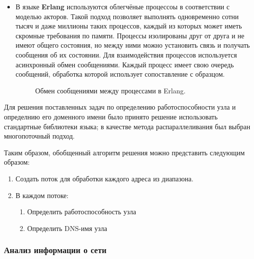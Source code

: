 \documentclass[a4paper]{article}
\begin{document}
\begin{itemize}
				\item В языке \textbf{Erlang} используются облегчёные процессоы в соответствии с моделью акторов. Такой подход позволяет выполнять одновременно сотни тысяч и даже миллионы таких процессов, каждый из которых может иметь скромные требования по памяти. Процессы изолированы друг от друга и не имеют общего состояния, но между ними можно установить связь и получать сообщения об их состоянии. Для взаимодействия процессов используется асинхронный обмен сообщениями. Каждый процесс имеет свою очередь сообщений, обработка которой использует сопоставление с образцом.
				\begin{figure}[H]
					\caption{Обмен сообщениями между процессами в Erlang.}
				\label{fig:ErlangThread}
			\end{figure}
		\end{itemize}
		
		Для решения поставленных задач по определению работоспособности узла и определнию его доменного имени было принято решение использовать стандартные библиотеки языка; в качестве метода распараллеливания был выбран многопоточный подход.
		
		Таким образом, обобщенный алгоритм решения можно представить следующим образом:
		
		\begin{enumerate}
			\item 
			Создать поток для обработки каждого адреса из диапазона.
			\item 
			В каждом потоке:
			\begin{enumerate}
				\item Определить работоспособность узла
				\item Определить DNS-имя узла
			\end{enumerate}
		\end{enumerate}
		
		\subsubsection{Анализ информации о сети}
		
\end{document}
